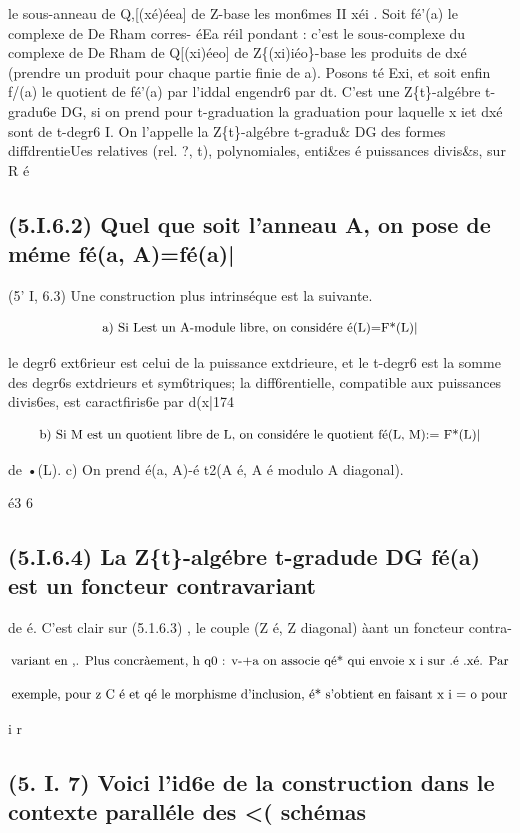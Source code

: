\documentclass[11pt]{article}
\theoremstyle{remark}
\begin{document}
le sous-anneau de Q,[(xé)éea] de Z-base les mon6mes II xéi . Soit fé'(a) le complexe de De Rham corres- éEa réil pondant : c'est le sous-complexe du complexe de De Rham de Q[(xi)éeo] de Z\{(xi)iéo\}-base les produits de dxé (prendre un produit pour chaque partie finie de a). Posons té Exi, et soit enfin f/(a) le quotient de fé'(a) par l'iddal engendr6 par dt. C'est une Z\{t\}-algébre t-gradu6e DG, si on prend pour t-graduation la graduation pour laquelle x iet dxé sont de t-degr6 I. On l'appelle la Z\{t\}-algébre t-gradu\& DG des formes diffdrentieUes relatives (rel. ?, t), polynomiales, enti\&es é puissances divis\&s, sur R é

\subsection*{(5.I.6.2) Quel que soit l'anneau A, on pose de méme fé(a, A)=fé(a)|}

(5' I, 6.3) Une construction plus intrinséque est la suivante.

\[\text{\small a) Si Lest un A-module libre, on considére é(L)=F*(L)|}\]

le degr6 ext6rieur est celui de la puissance extdrieure, et le t-degr6 est la somme des degr6s extdrieurs et sym6triques; la diff6rentielle, compatible aux puissances divis6es, est caractfiris6e par d(x|174

\[\text{\small b) Si M est un quotient libre de L, on considére le quotient fé(L, M):= F*(L)|}\]

de •(L). c) On prend é(a, A)-é t2(A é, A é modulo A diagonal).

é3 6

\subsection*{(5.I.6.4) La Z\{t\}-algébre t-gradude DG fé(a) est un foncteur contravariant}

de é. C'est clair sur (5.1.6.3) , le couple (Z é, Z diagonal) àant un foncteur contra-

\[\text{\small variant en ,. Plus concràement, h q0 : v-+a on associe qé* qui envoie x i sur .é .xé. Par}\]

\[\text{\small exemple, pour z C é et qé le morphisme d'inclusion, é* s'obtient en faisant x i = o pour}\]

i r

\subsection*{(5. I. 7) Voici l'id6e de la construction dans le contexte paralléle des <( schémas}
\end{document}

